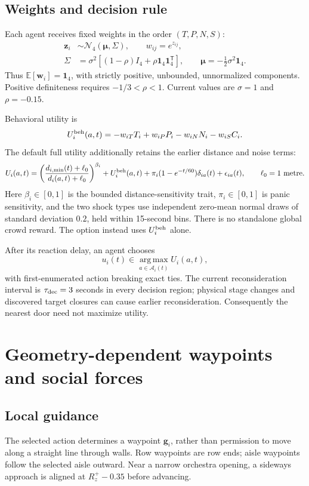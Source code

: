 \documentclass[11pt]{article}
\newcommand{\code}[1]{\texttt{\detokenize{#1}}}
\begin{document}
\subsection{Weights and decision rule}

Each agent receives fixed weights in the order $(T,P,N,S)$:
\begin{align}
 \mathbf z_i&\sim\mathcal N_4(\boldsymbol\mu,\Sigma),\qquad
 w_{ij}=e^{z_{ij}},\\
 \Sigma&=\sigma^2[(1-\rho)I_4+\rho\mathbf1_4\mathbf1_4^{\mathsf T}],
 \qquad\boldsymbol\mu=-\tfrac12\sigma^2\mathbf1_4.
\end{align}
Thus $\mathbb E[\mathbf w_i]=\mathbf1_4$, with strictly positive, unbounded,
unnormalized components. Positive definiteness requires $-1/3<\rho<1$.
Current values are $\sigma=1$ and $\rho=-0.15$.

Behavioral utility is
\[
 U_i^{\rm beh}(a,t)=-w_{iT}T_i+w_{iP}P_i-w_{iN}N_i-w_{iS}C_i.
\]
The default full utility additionally retains the earlier distance and noise
terms:
\[
 U_i(a,t)=\left(\frac{d_{i,\min}(t)+\ell_0}{d_i(a,t)+\ell_0}\right)^{\beta_i}
       +U_i^{\rm beh}(a,t)
       +\pi_i(1-e^{-t/60})\delta_{ia}(t)+\epsilon_{ia}(t),
 \qquad \ell_0=1\text{ metre}.
\]
Here $\beta_i\in[0,1]$ is the bounded distance-sensitivity trait,
$\pi_i\in[0,1]$ is panic sensitivity, and the two shock types use independent
zero-mean normal draws of standard deviation $0.2$, held within 15-second
bins. There is no standalone global crowd reward. The
\code{behavioralOnly} option instead uses $U_i^{\rm beh}$ alone.

After its reaction delay, an agent chooses
\[
 u_i(t)\in\operatorname*{arg\,max}_{a\in\mathcal A_i(t)} U_i(a,t),
\]
with first-enumerated action breaking exact ties. The current reconsideration
interval is $\tau_{\rm dec}=3$ seconds in every decision region; physical stage
changes and discovered target closures can cause earlier reconsideration.
Consequently the nearest door need not maximize utility.

\section{Geometry-dependent waypoints and social forces}

\subsection{Local guidance}

The selected action determines a waypoint $\mathbf g_i$, rather than permission
to move along a straight line through walls. Row waypoints are row ends;
aisle waypoints follow the selected aisle outward. Near a narrow orchestra
opening, a sideways approach is aligned at $R_z^+-0.35$ before advancing.
\end{document}
